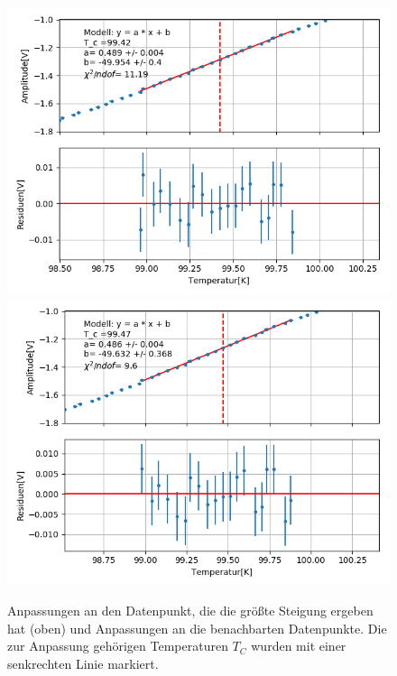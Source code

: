 \documentclass[12pt,a4paper]{article}
\begin{document}
\begin{figure}
\includegraphics[scale=0.5]{Bilder/Haupt_Supra/X1_Steigung4.png}
\includegraphics[scale=0.5]{Bilder/Haupt_Supra/X1_Steigung5.png}

\caption{Anpassungen an den Datenpunkt, die die größte Steigung ergeben hat (oben) und Anpassungen an die benachbarten Datenpunkte. Die zur Anpassung gehörigen Temperaturen $T_C$ wurden mit einer senkrechten Linie markiert.}
\label{fig:Supra_X1anpass}
\end{figure}
\end{document}

